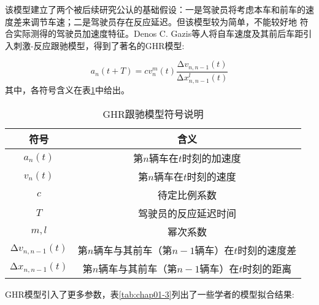 该模型建立了两个被后续研究公认的基础假设：一是驾驶员将考虑本车和前车的速度差来调节车速；二是驾驶员存在反应延迟。但该模型较为简单，不能较好地
符合实际测得的驾驶员加速度特征。Denos C. Gazis等人将自车速度及其前后车距引入刺激-反应跟驰模型，得到了著名的GHR模型\cite{Gazis1961NonlinearFM}:

\begin{equation}
  a_n(t+T) = cv_n^m(t)\frac{\increment{v_{n, n-1}}(t)}{\increment{x_{n, n-1}^l}(t)}
  \label{eq:chap01-2}
\end{equation}
其中，各符号含义在表\ref{tab:chap01-2}中给出。

\begin{table}
  \centering
  \caption{GHR跟驰模型符号说明}
  \begin{tabular}{cc}
    \toprule
    符号          &  含义                         \\
    \midrule
    $a_n(t)$   & 第$n$辆车在$t$时刻的加速度         \\
    $v_n(t)$   & 第$n$辆车在$t$时刻的速度         \\
    $c$        & 待定比例系数                    \\
    $T$        & 驾驶员的反应延迟时间  \\
    $m, l$        & 幂次系数         \\
    $\increment{v_{n, n-1}}(t)$  &  第$n$辆车与其前车（第$n-1$辆车）在$t$时刻的速度差   \\
    $\increment{x_{n, n-1}}(t)$  &  第$n$辆车与其前车（第$n-1$辆车）在$t$时刻的距离   \\
    \bottomrule
  \end{tabular}
  \label{tab:chap01-2}
\end{table}

GHR模型引入了更多参数，表\ref{tab:chap01-3}列出了一些学者的模型拟合结果:


